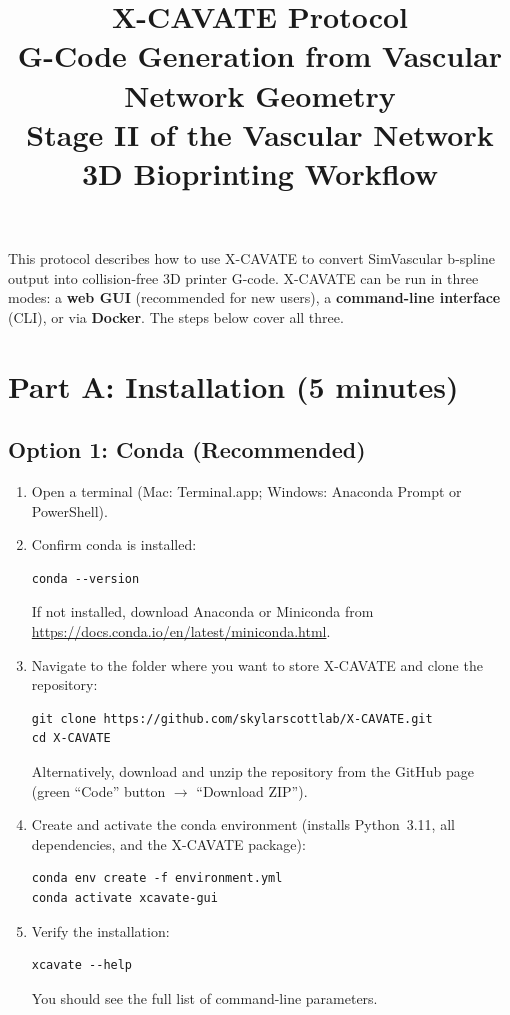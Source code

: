 \documentclass[11pt,letterpaper]{article}
\title{
    \vspace{-1cm}
    \textbf{X-CAVATE Protocol}\\[6pt]
    \large G-Code Generation from Vascular Network Geometry\\[4pt]
    \normalsize Stage II of the Vascular Network 3D Bioprinting Workflow
}
\author{}
\date{}
\begin{document}
\maketitle
\thispagestyle{fancy}

\noindent This protocol describes how to use X-CAVATE to convert SimVascular b-spline output into collision-free 3D printer G-code. X-CAVATE can be run in three modes: a \textbf{web GUI} (recommended for new users), a \textbf{command-line interface} (CLI), or via \textbf{Docker}. The steps below cover all three.

\tableofcontents
\newpage

\section{Part A: Installation (5 minutes)}

\subsection{Option 1: Conda (Recommended)}

\begin{enumerate}
    \item Open a terminal (Mac: Terminal.app; Windows: Anaconda Prompt or PowerShell).

    \item Confirm conda is installed:
    \begin{lstlisting}
conda --version
    \end{lstlisting}
    If not installed, download Anaconda or Miniconda from \url{https://docs.conda.io/en/latest/miniconda.html}.

    \item Navigate to the folder where you want to store X-CAVATE and clone the repository:
    \begin{lstlisting}
git clone https://github.com/skylarscottlab/X-CAVATE.git
cd X-CAVATE
    \end{lstlisting}
    Alternatively, download and unzip the repository from the GitHub page (green ``Code'' button $\to$ ``Download ZIP'').

    \item Create and activate the conda environment (installs Python~3.11, all dependencies, and the X-CAVATE package):
    \begin{lstlisting}
conda env create -f environment.yml
conda activate xcavate-gui
    \end{lstlisting}

    \item Verify the installation:
    \begin{lstlisting}
xcavate --help
    \end{lstlisting}
    You should see the full list of command-line parameters.
\end{enumerate}
\end{document}
